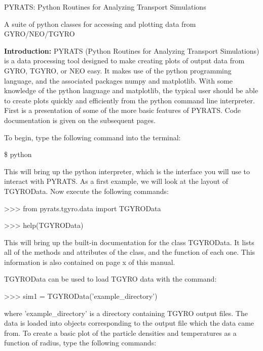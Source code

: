 \documentclass{article}
\begin{document}
\begin{center}
\Large
PYRATS:
Python Routines for Analyzing Transport Simulations

A suite of python classes for accessing and plotting data from GYRO/NEO/TGYRO
\end{center}
\normalsize

\noindent \textbf{Introduction: }PYRATS (Python Routines for Analyzing Transport Simulations) is a data processing tool designed to make creating plots of output data from GYRO, TGYRO, or NEO easy.  It makes use of the python programming language, and the associated packages numpy and matplotlib.  With some knowledge of the python language and matplotlib, the typical user should be able to create plots quickly and efficiently from the python command line interpreter.  First is a presentation of some of the more basic features of PYRATS.  Code documentation is given on the subsequent pages.  

\noindent To begin, type the following command into the terminal:
\fontfamily{\ttdefault}\selectfont

\$ python

\fontfamily{\rmdefault}\selectfont
\noindent This will bring up the python interpreter, which is the interface you will use to interact with PYRATS.  As a first example, we will look at the layout of TGYROData.  Now execute the following commands:
\fontfamily{\ttdefault}\selectfont

>>> from pyrats.tgyro.data import TGYROData
\addtolength{\parskip}{-\baselineskip}

>>> help(TGYROData)

\addtolength{\parskip}{\baselineskip}
\fontfamily{\rmdefault}\selectfont
\noindent This will bring up the built-in documentation for the class TGYROData.  It lists all of the methods and attributes of the class, and the function of each one.  This information is also contained on page x of this manual.

\noindent TGYROData can be used to load TGYRO data with the command:
\fontfamily{\ttdefault}\selectfont

>>> sim1 = TGYROData('example\_directory')

\fontfamily{\rmdefault}\selectfont
\noindent where 'example\_directory' is a directory containing TGYRO output files.  The data is loaded into objects corresponding to the output file which the data came from.  To create a basic plot of the particle densities and temperatures as a function of radius, type the following commands:
\fontfamily{\ttdefault}\selectfont
\end{document}
